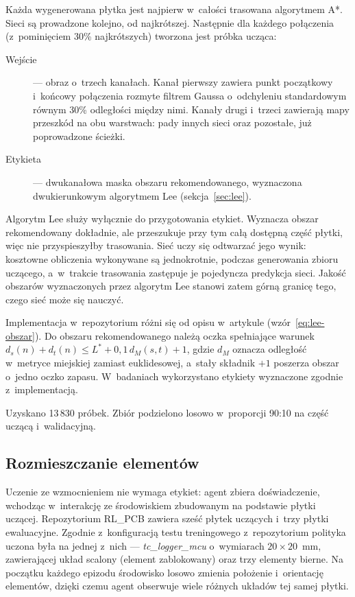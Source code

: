 Każda wygenerowana płytka jest najpierw w~całości trasowana algorytmem A*.
Sieci są prowadzone kolejno, od najkrótszej. Następnie dla każdego połączenia
(z~pominięciem 30\% najkrótszych) tworzona jest próbka ucząca:
\begin{description}
  \item[Wejście] --- obraz o~trzech kanałach. Kanał pierwszy zawiera punkt
    początkowy i~końcowy połączenia rozmyte filtrem Gaussa o~odchyleniu
    standardowym równym 30\% odległości między nimi. Kanały drugi i~trzeci
    zawierają mapy przeszkód na obu warstwach: pady innych sieci oraz
    pozostałe, już poprowadzone ścieżki.
  \item[Etykieta] --- dwukanałowa maska obszaru rekomendowanego,
    wyznaczona dwukierunkowym algorytmem Lee (sekcja~\ref{sec:lee}).
\end{description}

Algorytm Lee służy wyłącznie do przygotowania etykiet. Wyznacza obszar
rekomendowany dokładnie, ale przeszukuje przy tym całą dostępną część
płytki, więc nie przyspieszyłby trasowania. Sieć uczy się odtwarzać jego
wynik: kosztowne obliczenia wykonywane są jednokrotnie, podczas generowania
zbioru uczącego, a~w~trakcie trasowania zastępuje je pojedyncza predykcja
sieci. Jakość obszarów wyznaczonych przez algorytm Lee stanowi zatem górną
granicę tego, czego sieć może się nauczyć.

Implementacja w~repozytorium różni się od opisu w~artykule
(wzór~\ref{eq:lee-obszar}). Do obszaru rekomendowanego należą oczka
spełniające warunek $d_s(n) + d_t(n) \le L^* + 0{,}1\,d_M(s,t) + 1$, gdzie
$d_M$ oznacza odległość w~metryce miejskiej zamiast euklidesowej, a~stały
składnik $+1$ poszerza obszar o~jedno oczko zapasu. W~badaniach
wykorzystano etykiety wyznaczone zgodnie z~implementacją.

Uzyskano 13\,830 próbek. Zbiór podzielono losowo w~proporcji
90:10 na część uczącą i~walidacyjną.

\subsection{Rozmieszczanie elementów}
\label{sec:zbior-uczacy-rozmieszczanie}

Uczenie ze wzmocnieniem nie wymaga etykiet: agent zbiera doświadczenie,
wchodząc w~interakcję ze środowiskiem zbudowanym na podstawie płytki
uczącej. Repozytorium RL\_PCB zawiera sześć płytek uczących i~trzy
płytki ewaluacyjne. Zgodnie z~konfiguracją testu treningowego
z~repozytorium polityka uczona była na jednej z~nich ---
\emph{tc\_logger\_mcu} o~wymiarach $20 \times 20$~mm, zawierającej układ
scalony (element zablokowany) oraz trzy elementy bierne. Na początku
każdego epizodu środowisko losowo zmienia położenie i~orientację
elementów, dzięki czemu agent obserwuje wiele różnych układów tej samej
płytki.

